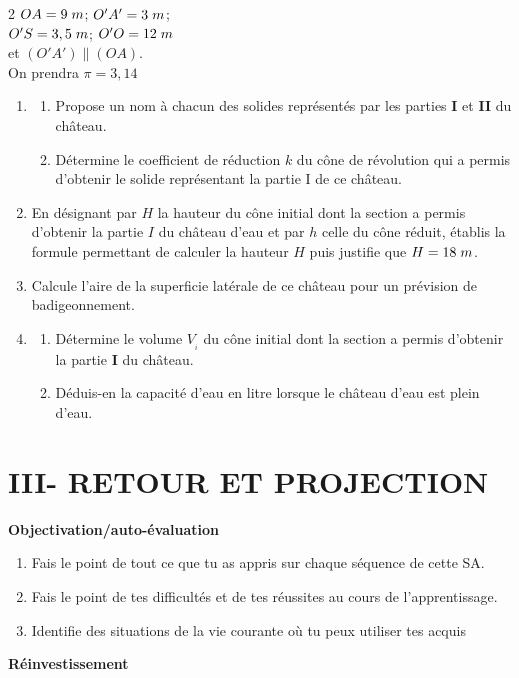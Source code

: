 \begin{multicols*}{2}
  	$OA=9\hspace{0.1cm}m$; $O'A'=3\hspace{0.1cm}m$;\\ $O'S=3,5\hspace{0.1cm}m$; $O'O= 12\hspace{0.1cm}m$\\ et $(O'A')\lVert(OA)$.\\
  	On prendra  $\pi=3,14$
  	\begin{enumerate}
  		\item 
  		\begin{enumerate}
  			\item  Propose un nom à chacun des solides représentés par les parties \textbf{I} et \textbf{II} du château.
  			\item   Détermine le coefficient de réduction $k$ du cône de révolution qui a permis d’obtenir le solide 
  			représentant la partie I de ce château. 
  		\end{enumerate}	
  		\item En désignant par $H$ la hauteur du cône initial dont la section a permis d’obtenir la partie $I$ du château d’eau et par $h$ celle du cône réduit, établis la formule permettant de calculer la hauteur $H$ puis justifie que $H=18\hspace{0.1cm}m$.
  		\item Calcule l’aire de la superficie latérale de ce château pour un prévision de badigeonnement.
  		\item 
  		\begin{enumerate}
  			\item  Détermine le volume $V_{_{i}}$ du cône initial dont la section a permis d’obtenir la partie \textbf{I} du château.
  			\item  Déduis-en la capacité d’eau en litre lorsque le château d’eau est plein
  			d’eau.
  		\end{enumerate}	
  	\end{enumerate}	
   
  	\section*{III- RETOUR ET PROJECTION}
  	 \textbf{Objectivation/auto-évaluation}
  	
  	\begin{enumerate}
  		\item  Fais le point de tout ce que tu as appris sur chaque séquence de cette SA. 
  		\item  Fais le point de tes difficultés et de tes réussites au cours de l'apprentissage.
  		\item  Identifie des situations de la vie courante où tu peux utiliser tes acquis
  	\end{enumerate}
  	 \textbf{Réinvestissement}
  	

\end{multicols*}

